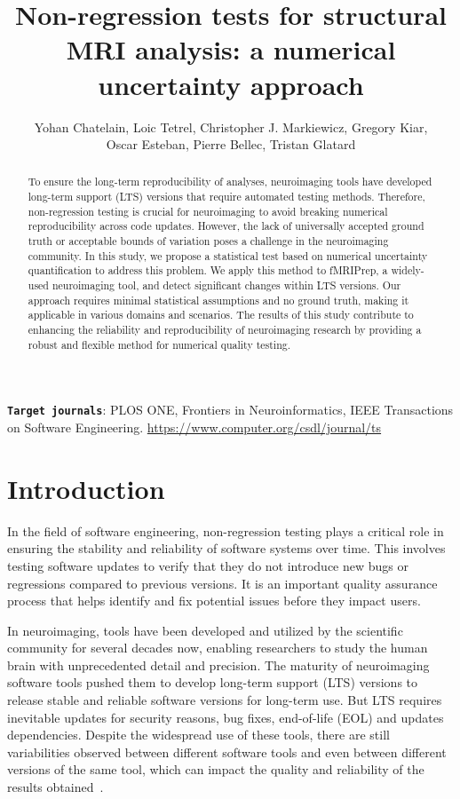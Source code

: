 \documentclass{article}
\title{Non-regression tests for structural MRI analysis: a numerical uncertainty approach}
\author{Yohan Chatelain, Loic Tetrel, Christopher J. Markiewicz, Gregory Kiar,\\ Oscar Esteban,  Pierre Bellec, Tristan Glatard}
\newcommand{\fmriprep}{fMRIPrep\xspace}
\begin{document}
\maketitle

\begin{abstract}
    To ensure the long-term reproducibility of analyses, neuroimaging tools have developed long-term support (LTS) versions that require automated testing methods. Therefore, non-regression testing is crucial for neuroimaging to avoid breaking numerical reproducibility across code updates. However, the lack of universally accepted ground truth or acceptable bounds of variation poses a challenge in the neuroimaging community. In this study, we propose a statistical test based on numerical uncertainty quantification to address this problem. We apply this method to \fmriprep, a widely-used neuroimaging tool, and detect significant changes within LTS versions. Our approach requires minimal statistical assumptions and no ground truth, making it applicable in various domains and scenarios. The results of this study contribute to enhancing the reliability and reproducibility of neuroimaging research by providing a robust and flexible method for numerical quality testing.
\end{abstract}

{
\small
\textbf{\texttt{Target journals}}: PLOS ONE, Frontiers in Neuroinformatics,  IEEE Transactions on
Software Engineering. \url{https://www.computer.org/csdl/journal/ts}
}

\section{Introduction}

In the field of software engineering, non-regression testing plays a critical role in ensuring the stability and reliability of software systems over time. This involves testing software updates to verify that they do not introduce new bugs or regressions compared to previous versions. It is an important quality assurance process that helps identify and fix potential issues before they impact users.

In neuroimaging, tools have been developed and utilized by the scientific community for several decades now, enabling researchers to study the human brain with unprecedented detail and precision. The maturity of neuroimaging software tools pushed them to develop long-term support (LTS) versions to release stable and reliable software versions for long-term use. But LTS requires inevitable updates for security reasons, bug fixes, end-of-life (EOL) and updates dependencies. Despite the widespread use of these tools, there are still variabilities observed between different software tools and even between different versions of the same tool, which can impact the quality and reliability of the results obtained~\cite{glatard2015reproducibility, bhagwat2021understanding}.
\end{document}
